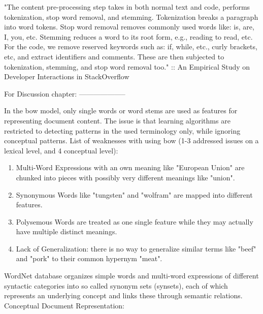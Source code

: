 "The content pre-processing step takes in both normal text and code, performs tokenization, stop word removal, and stemming. 
Tokenization breaks a paragraph into word tokens. 
Stop word removal removes commonly used words like: is, are, I, you, etc. 
Stemming reduces a word to its root form, e.g., reading to read, etc. 
For the code, we remove reserved keywords such as: if, while, etc., curly brackets, etc, and extract identifiers and comments. 
These are then subjected to tokenization, stemming, and stop word removal too."
\cite{Wang2013} :: An Empirical Study on Developer Interactions in StackOverflow


For Discussion chapter:
--------------------

In the \gls{bow} model, only single words or word stems are used as features for representing document content. 
The issue is that learning algorithms are restricted to detecting patterns in the used terminology only, while ignoring conceptual patterns. 
List of weaknesses with using \gls{bow} (1-3 addressed issues on a lexical level, and 4 conceptual level):
\begin{enumerate}
	\item Multi-Word Expressions with an own meaning like "European Union" are chunked into pieces with possibly very different meanings like "union".
	\item Synonymous Words like "tungsten" and "wolfram" are mapped into different features.
	\item Polysemous Words are treated as one single feature while they may actually have multiple distinct meanings.
	\item Lack of Generalization: there is no way to generalize similar terms like "beef" and "pork" to their common hypernym "meat".
\end{enumerate}
WordNet database organizes simple words and multi-word expressions of different syntactic categories into so called synonym sets (synsets), 
each of which represents an underlying concept and links these through semantic relations. \\
Conceptual Document Representation:

